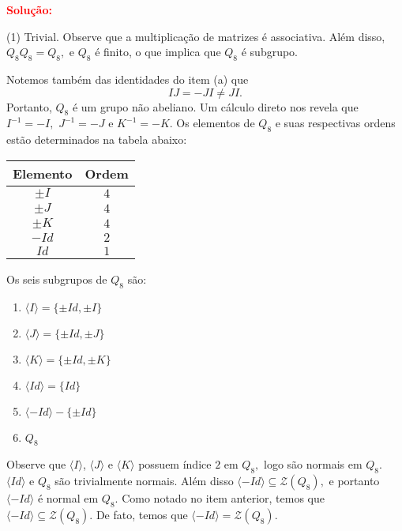 \documentclass[12pt, a4paper]{article}
\newcommand{\negrito}[1]{\mbox{\boldmath{$#1$}}}
\newcommand{\sol}{\textbf{\textcolor{red}{Solução:}} }
\begin{document}
\sol \begin{tasks}[counter-format={(tsk[a])},label-width=3.6ex, label-format = {\bfseries}, column-sep = {0pt}](1)
\task[\textcolor{Floresta}{$\negrito{(a)} $}] Trivial.
\task[\textcolor{Floresta}{$\negrito{(b)} $}] Observe que a multiplicação de matrizes é associativa. Além disso, $Q_8Q_8=Q_8,$ e $Q_8$ é finito, o que implica que $Q_8$ é subgrupo.

Notemos também das identidades do item (a) que
\[
IJ = -JI \neq JI.
\]
Portanto, $Q_8$ é um grupo não abeliano.
\task[\textcolor{Floresta}{$\negrito{(c)} $}] Um cálculo direto nos revela que $I^{-1} = -I,$ $J^{-1} = -J$ e $K^{-1} = -K.$
\task[\textcolor{Floresta}{$\negrito{(d)} $}] Os elementos de $Q_8$ e suas respectivas ordens estão determinados na tabela abaixo:
\begin{center}
\begin{tabular}{|c|c|}
\hline
     Elemento & Ordem \\ \hline
     $\pm I$ & $4$ \\   \hline
          $\pm J$ & $4$ \\   \hline
               $\pm K$ & $4$ \\   \hline
                    $- Id$ & $2$ \\   \hline
                                $Id$ & $1$ \\  \hline
\end{tabular}
\end{center}
\task[\textcolor{Floresta}{$\negrito{(e)} $}] Os seis subgrupos de $Q_8$ são:
\begin{enumerate}
    \item $\langle I \rangle = \{ \pm Id, \pm I \}$
    \item $\langle J \rangle = \{ \pm Id, \pm J \}$
    \item $\langle K \rangle = \{ \pm Id, \pm K \}$
    \item $\langle Id \rangle = \{ Id \}$
    \item $\langle -Id \rangle - \{ \pm Id \}$
    \item $Q_8$
\end{enumerate}
\task[\textcolor{Floresta}{$\negrito{(f)} $}] Observe que $\langle I \rangle$, $\langle J \rangle$ e $\langle K \rangle$ possuem índice $2$ em $Q_8,$ logo são normais em $Q_8.$ $\langle Id \rangle$ e $Q_8$ são trivialmente normais. Além disso $\langle -Id \rangle \subseteq \mathcal{Z}(Q_8),$ e portanto $\langle -Id \rangle$ é normal em $Q_8.$
\task[\textcolor{Floresta}{$\negrito{(g)} $}] Como notado no item anterior, temos que $\langle -Id \rangle \subseteq \mathcal{Z}(Q_8).$ De fato, temos que $\langle -Id \rangle = \mathcal{Z}(Q_8).$
\end{tasks}
\end{document}
